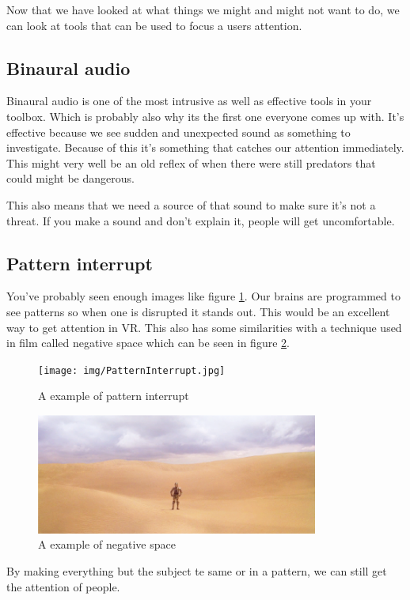 \documentclass{report}
\begin{document}
				Now that we have looked at what things we might and might not want to do, we can look at tools that can be used to focus a users attention.
				
				\subsection{Binaural audio}
				Binaural audio is one of the most intrusive as well as effective tools in your toolbox. Which is probably also why its the first one everyone comes up with. It's effective because we see sudden and unexpected sound as something to investigate. Because of this it's something that catches our attention immediately.			
				This might very well be an old reflex of when there were still predators that could might be dangerous.  
				
				This also means that we need a source of that sound to make sure it's not a threat. If you make a sound and don't explain it, people will get uncomfortable. 
				
				\subsection{Pattern interrupt}
				You've probably seen enough images like figure \ref{fig:PatternInterrupt}. Our brains are programmed to see patterns so when one is disrupted it stands out. This would be an excellent way to get attention in VR. This also has some similarities with a technique used in film called negative space which can be seen in figure \ref{fig:NegativeSpace}.
				
				\begin{figure}[H]
					\centering
 					\texttt{[image: img/PatternInterrupt.jpg]}
					\caption{A example of pattern interrupt}
					\label{fig:PatternInterrupt}
				\end{figure}
				\begin{figure}[H]
					\centering
					\includegraphics[width=25em]{img/C3PONegativeSpace.png}
					\caption{A example of negative space}
					\label{fig:NegativeSpace}
				\end{figure}
				By making everything but the subject te same or in a pattern, we can still get the attention of people.
				
\end{document}
